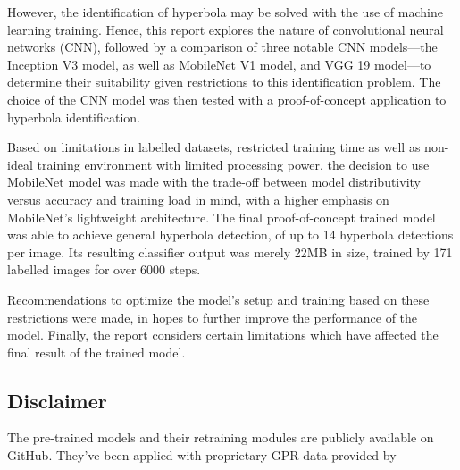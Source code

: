 \documentclass[se,blockletter]{uw-wkrpt}
\begin{document}
However, the identification of hyperbola may be solved with the use of machine learning training. Hence, this report explores the nature of convolutional neural networks (CNN), followed by a comparison of three notable CNN models---the Inception V3 model, as well as MobileNet V1 model, and VGG 19 model---to determine their suitability given restrictions to this identification problem. The choice of the CNN model was then tested with a proof-of-concept application to hyperbola identification.

Based on limitations in labelled datasets, restricted training time as well as non-ideal training environment with limited processing power, the decision to use MobileNet model was made with the trade-off between model distributivity versus accuracy and training load in mind, with a higher emphasis on MobileNet's lightweight architecture. The final proof-of-concept trained model was able to achieve general hyperbola detection, of up to 14 hyperbola detections per image. Its resulting classifier output was merely 22MB in size, trained by 171 labelled images for over 6000 steps.

Recommendations to optimize the model's setup and training based on these restrictions were made, in hopes to further improve the performance of the model. Finally, the report considers certain limitations which have affected the final result of the trained model.


\subsection{Disclaimer}
The pre-trained models and their retraining modules are publicly available on GitHub. They've been applied with proprietary GPR data provided by \thecompany{}  

\tableofcontents
\listoffigures
\listoftables

\mainmatter
\end{document}
